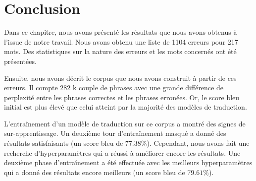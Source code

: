 \section{Conclusion}%
\label{sec.results.conclusion}

Dans ce chapitre, nous avons présenté les résultats que nous avons obtenus à l'issue de notre travail.
Nous avons obtenu une liste de 1104 erreurs pour 217 mots.
Des statistiques sur la nature des erreurs et les mots concernés ont été présentées.

Ensuite, nous avons décrit le corpus que nous avons construit à partir de ces erreurs.
Il compte 282 k couple de phrases avec une grande différence de perplexité 
entre les phrases correctes et les phrases erronées.
Or, le score \gls{bleu} initial est plus élevé que celui atteint par la majorité des modèles de traduction.

L'entraînement d'un modèle de traduction sur ce corpus a montré des signes de sur-apprentissage.
Un deuxième tour d'entraînement masqué a donné des résultats satisfaisants (un score \gls{bleu} de \(77.38\%\)).
Cependant, nous avons fait une recherche d'hyperparamètres qui a réussi à améliorer encore les résultats.
Une deuxième phase d'entraînement a été effectuée avec les meilleurs hyperparamètres 
qui a donné des résultats encore meilleurs (un score \gls{bleu} de \(79.61\%\)).
